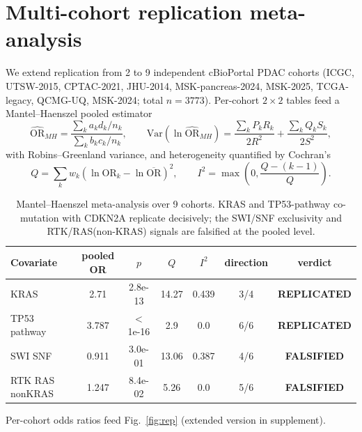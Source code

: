 \section{Multi-cohort replication meta-analysis}
We extend replication from 2 to 9 independent cBioPortal PDAC cohorts (ICGC, UTSW-2015, CPTAC-2021, JHU-2014, MSK-pancreas-2024, MSK-2025, TCGA-legacy, QCMG-UQ, MSK-2024; total $n=3773$). Per-cohort $2\times 2$ tables feed a Mantel--Haenszel pooled estimator
\begin{equation}
\widehat{\mathrm{OR}}_{MH}=\frac{\sum_k a_k d_k/n_k}{\sum_k b_k c_k/n_k},\qquad
\mathrm{Var}(\ln\widehat{\mathrm{OR}}_{MH})=\frac{\sum_k P_k R_k}{2R^2}+\frac{\sum_k Q_k S_k}{2S^2},
\end{equation}
with Robins--Greenland variance, and heterogeneity quantified by Cochran's
\begin{equation}
Q=\sum_k w_k(\ln\mathrm{OR}_k-\ln\overline{\mathrm{OR}})^2,\qquad I^2=\max\!\left(0,\frac{Q-(k-1)}{Q}\right).
\end{equation}
\begin{table}[h]\centering\small
\begin{tabular}{lcccccc}\hline\hline
Covariate & pooled OR & $p$ & $Q$ & $I^2$ & direction & verdict\\\hline
KRAS & 2.71 & 2.8e-13 & 14.27 & 0.439 & 3/4 & \textbf{REPLICATED}\\
TP53 pathway & 3.787 & $<$1e-16 & 2.9 & 0.0 & 6/6 & \textbf{REPLICATED}\\
SWI SNF & 0.911 & 3.0e-01 & 13.06 & 0.387 & 4/6 & \textbf{FALSIFIED}\\
RTK RAS nonKRAS & 1.247 & 8.4e-02 & 5.26 & 0.0 & 5/6 & \textbf{FALSIFIED}\\
\hline\hline\end{tabular}
\caption{Mantel--Haenszel meta-analysis over 9 cohorts. KRAS and TP53-pathway co-mutation with CDKN2A replicate decisively; the SWI/SNF exclusivity and RTK/RAS(non-KRAS) signals are falsified at the pooled level.}
\end{table}
Per-cohort odds ratios feed Fig.~\ref{fig:rep} (extended version in supplement).
